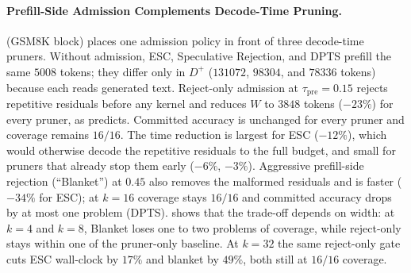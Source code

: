\paragraph{Prefill-Side Admission Complements Decode-Time Pruning.}
 (GSM8K block) places one admission policy in front of three decode-time pruners.
Without admission, ESC, Speculative Rejection, and DPTS prefill the same $5008$ tokens; they differ only in $D^{+}$ ($131072$, $98304$, and $78336$ tokens) because each reads generated text.
Reject-only admission at $\tau_{\mathrm{pre}}{=}0.15$ rejects repetitive residuals before any kernel and reduces $W$ to $3848$ tokens ($-23\%$) for every pruner, as  predicts.
Committed accuracy is unchanged for every pruner and coverage remains $16/16$.
The time reduction is largest for ESC ($-12\%$), which would otherwise decode the repetitive residuals to the full budget, and small for pruners that already stop them early ($-6\%$, $-3\%$).
Aggressive prefill-side rejection (``Blanket'') at $0.45$ also removes the malformed residuals and is faster ($-34\%$ for ESC); at $k{=}16$ coverage stays $16/16$ and committed accuracy drops by at most one problem (DPTS).
 shows that the trade-off depends on width: at $k{=}4$ and $k{=}8$, Blanket loses one to two problems of coverage, while reject-only stays within one of the pruner-only baseline.
At $k{=}32$ the same reject-only gate cuts ESC wall-clock by $17\%$ and blanket by $49\%$, both still at $16/16$ coverage.

\begin{table}[t]
\centering
\caption{ESC on GSM8K across fan-out width (Qwen3-8B, $n{=}16$).
Each cell: committed / any-finished / seconds.}
\label{tab:prefill-bar}
\end{table}

